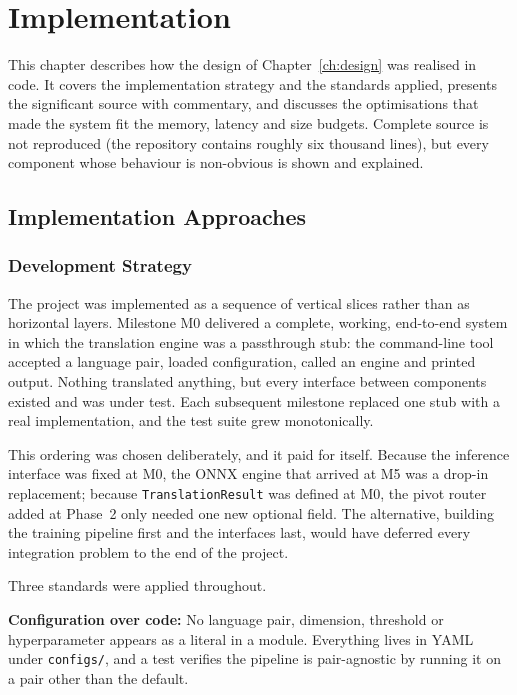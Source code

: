 \chapter{Implementation}
\label{ch:implementation}

This chapter describes how the design of Chapter~\ref{ch:design} was realised in
code. It covers the implementation strategy and the standards applied, presents
the significant source with commentary, and discusses the optimisations that
made the system fit the memory, latency and size budgets. Complete source is not
reproduced (the repository contains roughly six thousand lines), but every
component whose behaviour is non-obvious is shown and explained.

\section{Implementation Approaches}
\label{sec:implapproach}

\subsection{Development Strategy}
\label{subsec:strategy}

The project was implemented as a sequence of vertical slices rather than as
horizontal layers. Milestone M0 delivered a complete, working, end-to-end
system in which the translation engine was a passthrough stub: the command-line
tool accepted a language pair, loaded configuration, called an engine and
printed output. Nothing translated anything, but every interface between
components existed and was under test. Each subsequent milestone replaced one
stub with a real implementation, and the test suite grew monotonically.

This ordering was chosen deliberately, and it paid for itself. Because the
inference interface was fixed at M0, the ONNX engine that arrived at M5 was a
drop-in replacement; because \texttt{TranslationResult} was defined at M0, the
pivot router added at Phase~2 only needed one new optional field. The
alternative, building the training pipeline first and the interfaces last,
would have deferred every integration problem to the end of the project.

Three standards were applied throughout.

\textbf{Configuration over code:} No language pair, dimension, threshold or
hyperparameter appears as a literal in a module. Everything lives in YAML under
\texttt{configs/}, and a test verifies the pipeline is pair-agnostic by running
it on a pair other than the default.


